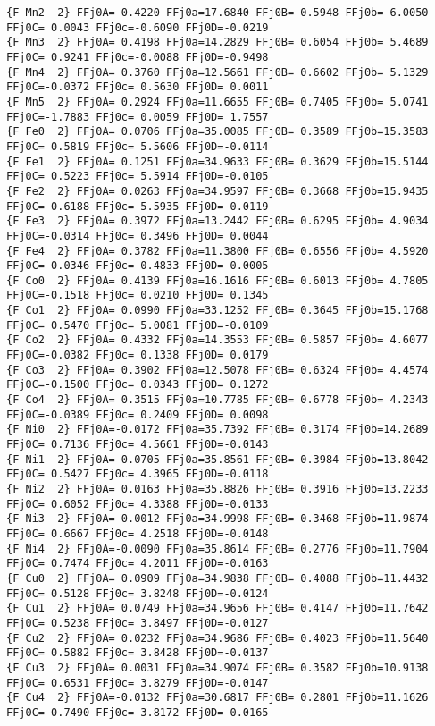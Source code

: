 {\begin{verbatim}
{F Mn2  2} FFj0A= 0.4220 FFj0a=17.6840 FFj0B= 0.5948 FFj0b= 6.0050 FFj0C= 0.0043 FFj0c=-0.6090 FFj0D=-0.0219 
{F Mn3  2} FFj0A= 0.4198 FFj0a=14.2829 FFj0B= 0.6054 FFj0b= 5.4689 FFj0C= 0.9241 FFj0c=-0.0088 FFj0D=-0.9498 
{F Mn4  2} FFj0A= 0.3760 FFj0a=12.5661 FFj0B= 0.6602 FFj0b= 5.1329 FFj0C=-0.0372 FFj0c= 0.5630 FFj0D= 0.0011 
{F Mn5  2} FFj0A= 0.2924 FFj0a=11.6655 FFj0B= 0.7405 FFj0b= 5.0741 FFj0C=-1.7883 FFj0c= 0.0059 FFj0D= 1.7557 
{F Fe0  2} FFj0A= 0.0706 FFj0a=35.0085 FFj0B= 0.3589 FFj0b=15.3583 FFj0C= 0.5819 FFj0c= 5.5606 FFj0D=-0.0114 
{F Fe1  2} FFj0A= 0.1251 FFj0a=34.9633 FFj0B= 0.3629 FFj0b=15.5144 FFj0C= 0.5223 FFj0c= 5.5914 FFj0D=-0.0105 
{F Fe2  2} FFj0A= 0.0263 FFj0a=34.9597 FFj0B= 0.3668 FFj0b=15.9435 FFj0C= 0.6188 FFj0c= 5.5935 FFj0D=-0.0119 
{F Fe3  2} FFj0A= 0.3972 FFj0a=13.2442 FFj0B= 0.6295 FFj0b= 4.9034 FFj0C=-0.0314 FFj0c= 0.3496 FFj0D= 0.0044 
{F Fe4  2} FFj0A= 0.3782 FFj0a=11.3800 FFj0B= 0.6556 FFj0b= 4.5920 FFj0C=-0.0346 FFj0c= 0.4833 FFj0D= 0.0005 
{F Co0  2} FFj0A= 0.4139 FFj0a=16.1616 FFj0B= 0.6013 FFj0b= 4.7805 FFj0C=-0.1518 FFj0c= 0.0210 FFj0D= 0.1345 
{F Co1  2} FFj0A= 0.0990 FFj0a=33.1252 FFj0B= 0.3645 FFj0b=15.1768 FFj0C= 0.5470 FFj0c= 5.0081 FFj0D=-0.0109 
{F Co2  2} FFj0A= 0.4332 FFj0a=14.3553 FFj0B= 0.5857 FFj0b= 4.6077 FFj0C=-0.0382 FFj0c= 0.1338 FFj0D= 0.0179 
{F Co3  2} FFj0A= 0.3902 FFj0a=12.5078 FFj0B= 0.6324 FFj0b= 4.4574 FFj0C=-0.1500 FFj0c= 0.0343 FFj0D= 0.1272 
{F Co4  2} FFj0A= 0.3515 FFj0a=10.7785 FFj0B= 0.6778 FFj0b= 4.2343 FFj0C=-0.0389 FFj0c= 0.2409 FFj0D= 0.0098 
{F Ni0  2} FFj0A=-0.0172 FFj0a=35.7392 FFj0B= 0.3174 FFj0b=14.2689 FFj0C= 0.7136 FFj0c= 4.5661 FFj0D=-0.0143 
{F Ni1  2} FFj0A= 0.0705 FFj0a=35.8561 FFj0B= 0.3984 FFj0b=13.8042 FFj0C= 0.5427 FFj0c= 4.3965 FFj0D=-0.0118 
{F Ni2  2} FFj0A= 0.0163 FFj0a=35.8826 FFj0B= 0.3916 FFj0b=13.2233 FFj0C= 0.6052 FFj0c= 4.3388 FFj0D=-0.0133 
{F Ni3  2} FFj0A= 0.0012 FFj0a=34.9998 FFj0B= 0.3468 FFj0b=11.9874 FFj0C= 0.6667 FFj0c= 4.2518 FFj0D=-0.0148 
{F Ni4  2} FFj0A=-0.0090 FFj0a=35.8614 FFj0B= 0.2776 FFj0b=11.7904 FFj0C= 0.7474 FFj0c= 4.2011 FFj0D=-0.0163 
{F Cu0  2} FFj0A= 0.0909 FFj0a=34.9838 FFj0B= 0.4088 FFj0b=11.4432 FFj0C= 0.5128 FFj0c= 3.8248 FFj0D=-0.0124 
{F Cu1  2} FFj0A= 0.0749 FFj0a=34.9656 FFj0B= 0.4147 FFj0b=11.7642 FFj0C= 0.5238 FFj0c= 3.8497 FFj0D=-0.0127 
{F Cu2  2} FFj0A= 0.0232 FFj0a=34.9686 FFj0B= 0.4023 FFj0b=11.5640 FFj0C= 0.5882 FFj0c= 3.8428 FFj0D=-0.0137 
{F Cu3  2} FFj0A= 0.0031 FFj0a=34.9074 FFj0B= 0.3582 FFj0b=10.9138 FFj0C= 0.6531 FFj0c= 3.8279 FFj0D=-0.0147 
{F Cu4  2} FFj0A=-0.0132 FFj0a=30.6817 FFj0B= 0.2801 FFj0b=11.1626 FFj0C= 0.7490 FFj0c= 3.8172 FFj0D=-0.0165 

\end{verbatim}}
